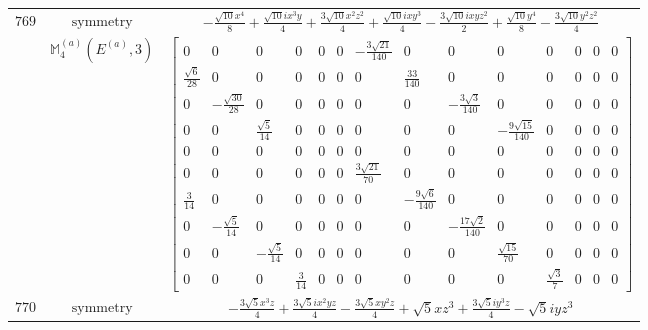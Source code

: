 \documentclass[fleqn,8pt,landscape]{jsarticle}
\begin{document}
\begin{longtable}{ccc}
$ 769 $ & $ \text{symmetry} $ & $ - \frac{\sqrt{10} x^{4}}{8} + \frac{\sqrt{10} i x^{3} y}{4} + \frac{3 \sqrt{10} x^{2} z^{2}}{4} + \frac{\sqrt{10} i x y^{3}}{4} - \frac{3 \sqrt{10} i x y z^{2}}{2} + \frac{\sqrt{10} y^{4}}{8} - \frac{3 \sqrt{10} y^{2} z^{2}}{4} $ \\
$  $ & $ \mathbb{M}_{4}^{(a)}(E^{(a)},3) $ & $ \begin{bmatrix} 0 & 0 & 0 & 0 & 0 & 0 & - \frac{3 \sqrt{21}}{140} & 0 & 0 & 0 & 0 & 0 & 0 & 0 \\ \frac{\sqrt{6}}{28} & 0 & 0 & 0 & 0 & 0 & 0 & \frac{33}{140} & 0 & 0 & 0 & 0 & 0 & 0 \\ 0 & - \frac{\sqrt{30}}{28} & 0 & 0 & 0 & 0 & 0 & 0 & - \frac{3 \sqrt{3}}{140} & 0 & 0 & 0 & 0 & 0 \\ 0 & 0 & \frac{\sqrt{5}}{14} & 0 & 0 & 0 & 0 & 0 & 0 & - \frac{9 \sqrt{15}}{140} & 0 & 0 & 0 & 0 \\ 0 & 0 & 0 & 0 & 0 & 0 & 0 & 0 & 0 & 0 & 0 & 0 & 0 & 0 \\ 0 & 0 & 0 & 0 & 0 & 0 & \frac{3 \sqrt{21}}{70} & 0 & 0 & 0 & 0 & 0 & 0 & 0 \\ \frac{3}{14} & 0 & 0 & 0 & 0 & 0 & 0 & - \frac{9 \sqrt{6}}{140} & 0 & 0 & 0 & 0 & 0 & 0 \\ 0 & - \frac{\sqrt{5}}{14} & 0 & 0 & 0 & 0 & 0 & 0 & - \frac{17 \sqrt{2}}{140} & 0 & 0 & 0 & 0 & 0 \\ 0 & 0 & - \frac{\sqrt{5}}{14} & 0 & 0 & 0 & 0 & 0 & 0 & \frac{\sqrt{15}}{70} & 0 & 0 & 0 & 0 \\ 0 & 0 & 0 & \frac{3}{14} & 0 & 0 & 0 & 0 & 0 & 0 & \frac{\sqrt{3}}{7} & 0 & 0 & 0 \end{bmatrix} $ \\ \hline
$ 770 $ & $ \text{symmetry} $ & $ - \frac{3 \sqrt{5} x^{3} z}{4} + \frac{3 \sqrt{5} i x^{2} y z}{4} - \frac{3 \sqrt{5} x y^{2} z}{4} + \sqrt{5} x z^{3} + \frac{3 \sqrt{5} i y^{3} z}{4} - \sqrt{5} i y z^{3} $ \\

\end{longtable}
\end{document}
